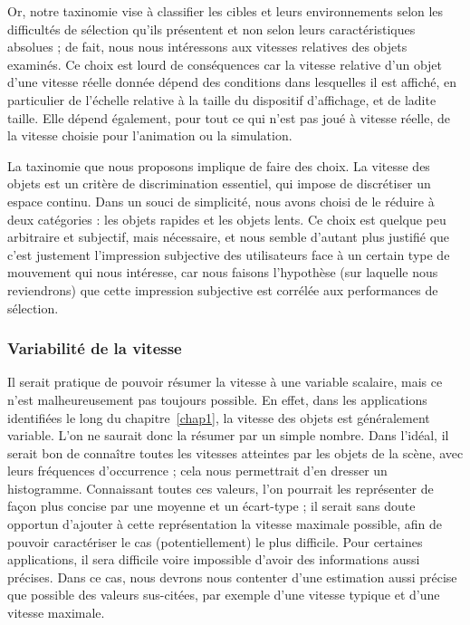 	Or, notre taxinomie vise à classifier les cibles et leurs environnements selon les difficultés de sélection qu'ils présentent et non selon leurs caractéristiques absolues ; de fait, nous nous intéressons aux vitesses relatives des objets examinés. Ce choix est lourd de conséquences car la vitesse relative d'un objet d'une vitesse réelle donnée dépend des conditions dans lesquelles il est affiché, en particulier de l'échelle relative à la taille du dispositif d'affichage, et de ladite taille. Elle dépend également, pour tout ce qui n'est pas joué à vitesse réelle, de la vitesse choisie pour l'animation ou la simulation.
	
	La taxinomie que nous proposons implique de faire des choix. La vitesse des objets est un critère de discrimination essentiel, qui impose de discrétiser un espace continu. Dans un souci de simplicité, nous avons choisi de le réduire à deux catégories : les objets rapides et les objets lents. Ce choix est quelque peu arbitraire et subjectif, mais nécessaire, et nous semble d'autant plus justifié que c'est justement l'impression subjective des utilisateurs face à un certain type de mouvement qui nous intéresse, car nous faisons l'hypothèse (sur laquelle nous reviendrons) que cette impression subjective est corrélée aux performances de sélection.
	
	\FloatBarrier \subsubsection{Variabilité de la vitesse}
	Il serait pratique de pouvoir résumer la vitesse à une variable scalaire, mais ce n'est malheureusement pas toujours possible. En effet, dans les applications identifiées le long du chapitre~\ref{chap1}, la vitesse des objets est généralement variable. L'on ne saurait donc la résumer par un simple nombre. Dans l'idéal, il serait bon de connaître toutes les vitesses atteintes par les objets de la scène, avec leurs fréquences d'occurrence ; cela nous permettrait d'en dresser un histogramme. Connaissant toutes ces valeurs, l'on pourrait les représenter de façon plus concise par une moyenne et un écart-type ; il serait sans doute opportun d'ajouter à cette représentation la vitesse maximale possible, afin de pouvoir caractériser le cas (potentiellement) le plus difficile. Pour certaines applications, il sera difficile voire impossible d'avoir des informations aussi précises. Dans ce cas, nous devrons nous contenter d'une estimation aussi précise que possible des valeurs sus-citées, par exemple d'une vitesse \og typique \fg{} et d'une vitesse maximale.
		

